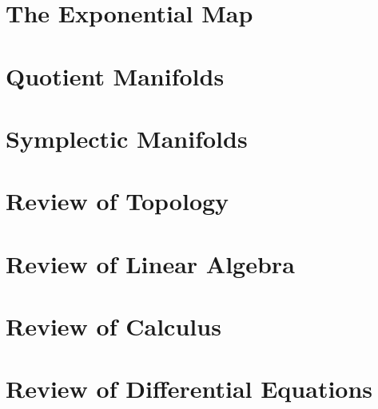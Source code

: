 \chapter{The Exponential Map}
\label{chap:exponential-map}


\chapter{Quotient Manifolds}
\label{chap:quotient-manifolds}


\chapter{Symplectic Manifolds}
\label{chap:symplectic-manifolds}


\appendix

\chapter{Review of Topology}
\label{chap:review-topology}


\chapter{Review of Linear Algebra}
\label{chap:review-linear-algebra}


\chapter{Review of Calculus}
\label{chap:review-calculus}


\chapter{Review of Differential Equations}
\label{chap:review-differential-equations}

